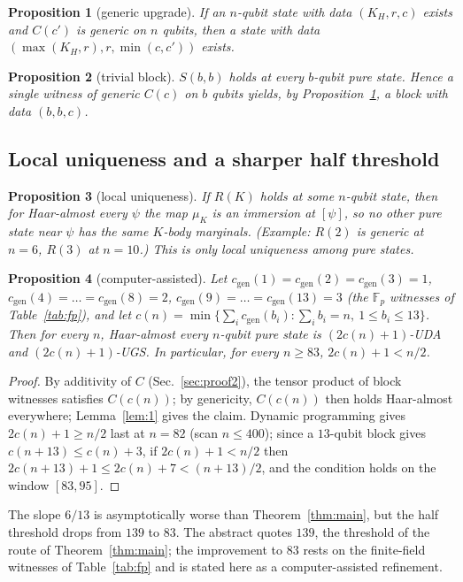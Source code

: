 \documentclass[aps,pra,onecolumn,superscriptaddress,nofootinbib,longbibliography,10pt]{revtex4-2}
\newtheorem{proposition}{Proposition}[section]
\theoremstyle{definition}
\newcommand{\FF}{\mathbb F}
\newcommand{\cgen}{c_{\mathrm{gen}}}
\begin{document}
\begin{proposition}[generic upgrade]\label{prop:upgrade}
If an $n$-qubit state with data $(K_H,r,c)$ exists and $C(c')$ is generic on $n$ qubits, then a state with data $(\max(K_H,r),r,\min(c,c'))$ exists.
\end{proposition}
\begin{proposition}[trivial block]\label{prop:triv}
$S(b,b)$ holds at every $b$-qubit pure state. Hence a single witness of generic $C(c)$ on $b$ qubits yields, by Proposition~\ref{prop:upgrade}, a block with data $(b,b,c)$.
\end{proposition}

\subsection{Local uniqueness and a sharper half threshold}
\begin{proposition}[local uniqueness]\label{prop:loc}
If $R(K)$ holds at some $n$-qubit state, then for Haar-almost every $\psi$ the map $\mu_K$ is an immersion at $[\psi]$, so no other pure state near $\psi$ has the same $K$-body marginals. (Example: $R(2)$ is generic at $n=6$, $R(3)$ at $n=10$.) This is only local uniqueness among pure states.
\end{proposition}

\begin{proposition}[computer-assisted]\label{prop:83}
Let $\cgen(1)=\cgen(2)=\cgen(3)=1$, $\cgen(4)=\dots=\cgen(8)=2$, $\cgen(9)=\dots=\cgen(13)=3$ (the $\FF_p$ witnesses of Table~\ref{tab:fp}), and let
$c(n)=\min\{\sum_i\cgen(b_i):\sum_ib_i=n,\ 1\le b_i\le13\}$. Then for every $n$, Haar-almost every $n$-qubit pure state is $(2c(n)+1)$-UDA and $(2c(n)+1)$-UGS. In particular, for every $n\ge83$, $2c(n)+1<n/2$.
\end{proposition}
\begin{proof}
By additivity of $C$ (Sec.~\ref{sec:proof2}), the tensor product of block witnesses satisfies $C(c(n))$; by genericity, $C(c(n))$ then holds Haar-almost everywhere; Lemma~\ref{lem:1} gives the claim. Dynamic programming gives $2c(n)+1\ge n/2$ last at $n=82$ (scan $n\le400$); since a $13$-qubit block gives $c(n+13)\le c(n)+3$, if $2c(n)+1<n/2$ then $2c(n+13)+1\le2c(n)+7<(n+13)/2$, and the condition holds on the window $[83,95]$.
\end{proof}
\noindent The slope $6/13$ is asymptotically worse than Theorem~\ref{thm:main}, but the half threshold drops from $139$ to $83$. The abstract quotes $139$, the threshold of the route of Theorem~\ref{thm:main}; the improvement to $83$ rests on the finite-field witnesses of Table~\ref{tab:fp} and is stated here as a computer-assisted refinement.
\end{document}
